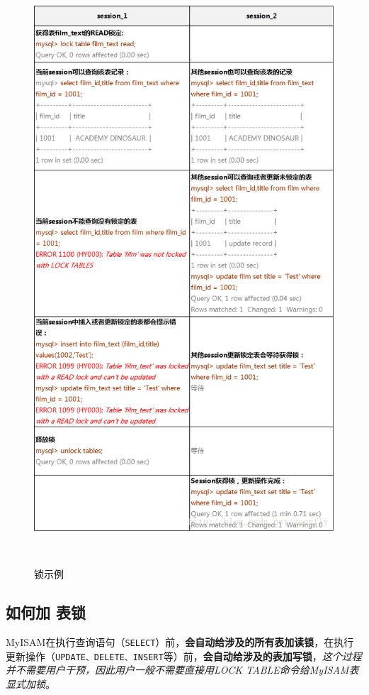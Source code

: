 \documentclass[UTF8,a4paper,12pt]{ctexbook}
\begin{document}
		\begin{figure}[H]
			\centering
			\includegraphics[height=22cm]{lock}
			\caption{锁示例}
		\end{figure}
		
		\subsection{如何加 表锁}
			MyISAM在执行查询语句（\verb|SELECT|）前，\textbf{会自动给涉及的所有表加读锁}，在执行更新操作（\verb|UPDATE、DELETE、INSERT|等）前，\textbf{会自动给涉及的表加写锁}，\textit{这个过程并不需要用户干预，因此用户一般不需要直接用LOCK TABLE命令给MyISAM表显式加锁}。
			
\end{document}
